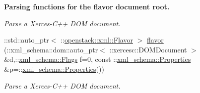 \begin{Indent}{\bf Parsing functions for the flavor document root.}
\begin{DoxyCompactItemize}
\begin{DoxyCompactList}\small\item\em Parse a Xerces-\/C++ DOM document. \item\end{DoxyCompactList}\item 
::std::auto\_\-ptr$<$ ::\hyperlink{classopenstack_1_1xml_1_1Flavor}{openstack::xml::Flavor} $>$ \hyperlink{namespaceopenstack_1_1xml_a0d9e26abe71f4757f6ce10744b4a48a7}{flavor} (::xml\_\-schema::dom::auto\_\-ptr$<$ ::xercesc::DOMDocument $>$ \&d,::\hyperlink{namespacexml__schema_affb4c227cbd9aa7453dd1dc5a1401943}{xml\_\-schema::Flags} f=0, const ::\hyperlink{namespacexml__schema_ad27ce19a7ee1d3b1064092648898f64c}{xml\_\-schema::Properties} \&p=::\hyperlink{namespacexml__schema_ad27ce19a7ee1d3b1064092648898f64c}{xml\_\-schema::Properties}())
\begin{DoxyCompactList}\small\item\em Parse a Xerces-\/C++ DOM document. \item\end{DoxyCompactList}\end{DoxyCompactItemize}
\end{Indent}
